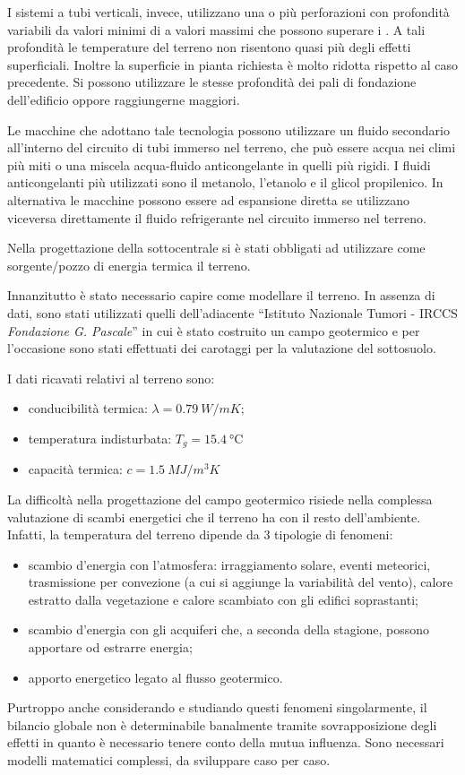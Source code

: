 I sistemi a tubi verticali, invece, utilizzano una o più perforazioni con profondità variabili da valori minimi di  a valori massimi che possono superare i . A tali profondità le temperature del terreno non risentono quasi più degli effetti superficiali. Inoltre la superficie in pianta richiesta è molto ridotta rispetto al caso precedente. Si possono utilizzare le stesse profondità dei pali di fondazione dell'edificio oppore raggiungerne maggiori. 

Le macchine che adottano tale tecnologia possono utilizzare un fluido secondario all'interno del circuito di tubi immerso nel terreno, che può essere acqua nei climi più miti o una miscela acqua-fluido anticongelante in quelli più rigidi. I fluidi anticongelanti più utilizzati sono il metanolo, l'etanolo e il glicol propilenico. In alternativa le macchine possono essere ad espansione diretta se utilizzano viceversa direttamente il fluido refrigerante nel circuito immerso nel terreno.

\vspace{1em}
Nella progettazione della sottocentrale si è stati obbligati ad utilizzare come sorgente/pozzo di energia termica il terreno.

Innanzitutto è stato necessario capire come modellare il terreno. In assenza di dati, sono stati utilizzati quelli dell'adiacente ``Istituto Nazionale Tumori - IRCCS \emph{Fondazione G. Pascale}'' in cui è stato costruito un campo geotermico e per l'occasione sono stati effettuati dei carotaggi per la valutazione del sottosuolo.

I dati ricavati relativi al terreno sono:
\begin{itemize}
	\item conducibilità termica: $\lambda = \SI{0.79}{W/mK}$;
	\item temperatura indisturbata: $T_g=\SI{15.4}{\degreeCelsius}$
	\item capacità termica: $c=\SI{1.5}{MJ/m^3K}$
\end{itemize}

La difficoltà nella progettazione del campo geotermico risiede nella complessa valutazione di scambi energetici che il terreno ha con il resto dell'ambiente. Infatti, la temperatura del terreno dipende da 3 tipologie di fenomeni:
\begin{itemize}
	\item scambio d'energia con l'atmosfera: irraggiamento solare, eventi meteorici, trasmissione per convezione (a cui si aggiunge la variabilità del vento), calore estratto dalla vegetazione e calore scambiato con gli edifici soprastanti;
	\item scambio d'energia con gli acquiferi che, a seconda della stagione, possono apportare od estrarre energia;
	\item apporto energetico legato al flusso geotermico.
\end{itemize}
Purtroppo anche considerando e studiando questi fenomeni singolarmente, il bilancio globale non è determinabile banalmente tramite sovrapposizione degli effetti in quanto è necessario tenere conto della mutua influenza. Sono necessari modelli matematici complessi, da sviluppare caso per caso.

